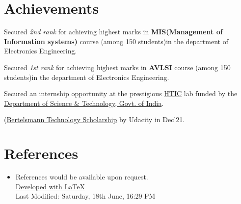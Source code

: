 \documentclass[a4paper,20pt]{article}
\newcommand{\resumeSubHeadingListStart}{\begin{itemize}[leftmargin=*]}
\newcommand{\resumeSubHeadingListEnd}{\end{itemize}}
\begin{document}
\section{Achievements}
\begin{description}[font=$\bullet$]
\item{Secured \textit{2nd rank} for achieving highest marks in \textbf{MIS(Management of Information systems)} course (among 150 students)in the department of Electronics Engineering.}
\item{Secured \textit{1st rank} for achieving highest marks in \textbf{AVLSI} course (among 150 students)in the department of Electronics Engineering.}
\item{Secured an internship opportunity at the prestigious \href{http://hticlab.org/htic/}{HTIC} lab funded by the \href{https://dst.gov.in/}{Department of Science \& Technology, Govt. of India}.}
\item(\href{https://www.udacity.com/bertelsmann-tech-scholarships}{Bertelsmann Technology Scholarship} by Udacity in Dec'21.

\end{description}
\vspace{2pt}

\section{References}
  \resumeSubHeadingListStart
   \item References would be available upon request.\\
   \vspace{450 pt}
   {\href{https://raw.githubusercontent.com/addy1997/CV/main/Adwait_CV.tex}{Developed with \LaTeX}} \\
   {Last Modified: Saturday, 18th June, 16:29 PM}
  \resumeSubHeadingListEnd
\end{document}
